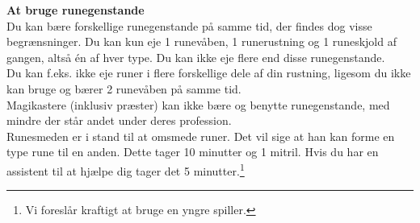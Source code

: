 \textbf{At bruge runegenstande}\\
Du kan bære forskellige runegenstande på samme tid, der findes dog visse begrænsninger. Du kan kun eje 1 runevåben, 1 runerustning og 1 runeskjold af gangen, altså én af hver type. Du kan ikke eje flere end disse runegenstande.\\
Du kan f.eks. ikke eje runer i flere forskellige dele af din rustning, ligesom du ikke kan bruge og bærer 2 runevåben på samme tid.\\

Magikastere (inklusiv præster) kan ikke bære og benytte runegenstande, med mindre der står andet under deres profession.\\

Runesmeden er i stand til at omsmede runer. Det vil sige at han kan forme en type rune til en anden. Dette tager 10 minutter og 1 mitril. Hvis du har en assistent til at hjælpe dig tager det 5 minutter.\footnote{Vi foreslår kraftigt at bruge en yngre spiller.}\\

